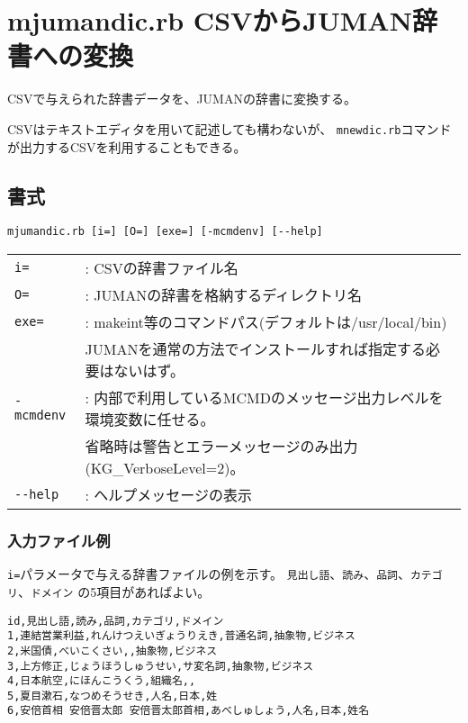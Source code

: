 



\section{mjumandic.rb CSVからJUMAN辞書への変換\label{sect:mjumandic}}


CSVで与えられた辞書データを、JUMANの辞書に変換する。

CSVはテキストエディタを用いて記述しても構わないが、
\verb|mnewdic.rb|コマンドが出力するCSVを利用することもできる。

\subsection{書式}
\begin{verbatim}
mjumandic.rb [i=] [O=] [exe=] [-mcmdenv] [--help]
\end{verbatim}

\begin{table}[htbp]
{\small
\begin{tabular}{ll}
\verb|i=|       & :  CSVの辞書ファイル名 \\
\verb|O=|       & :  JUMANの辞書を格納するディレクトリ名 \\
\verb|exe=|     & :  makeint等のコマンドパス(デフォルトは/usr/local/bin) \\
                &    JUMANを通常の方法でインストールすれば指定する必要はないはず。 \\
\verb|-mcmdenv| & :  内部で利用しているMCMDのメッセージ出力レベルを環境変数に任せる。 \\
                &    省略時は警告とエラーメッセージのみ出力(KG\_VerboseLevel=2)。 \\
\verb|--help|   & : ヘルプメッセージの表示 \\
\end{tabular} 
}
\end{table} 

\subsubsection*{入力ファイル例}

\verb|i=|パラメータで与える辞書ファイルの例を示す。
\verb|見出し語|、\verb|読み|、\verb|品詞|、\verb|カテゴリ|、\verb|ドメイン|
の5項目があればよい。

\begin{Verbatim}[baselinestretch=0.7,frame=single]
id,見出し語,読み,品詞,カテゴリ,ドメイン
1,連結営業利益,れんけつえいぎょうりえき,普通名詞,抽象物,ビジネス
2,米国債,べいこくさい,,抽象物,ビジネス
3,上方修正,じょうほうしゅうせい,サ変名詞,抽象物,ビジネス
4,日本航空,にほんこうくう,組織名,,
5,夏目漱石,なつめそうせき,人名,日本,姓
6,安倍首相 安倍晋太郎 安倍晋太郎首相,あべしゅしょう,人名,日本,姓名
\end{Verbatim}

